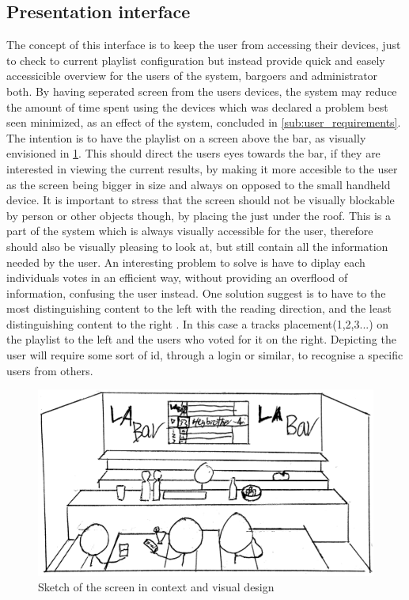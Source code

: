 \subsection{Presentation interface}

The concept of this interface is to keep the user from accessing their devices, just to check to current playlist configuration but instead provide quick and easely accessicible overview for the users of the system, bargoers and administrator both. By having seperated screen from the users devices, the system may reduce the amount of time spent using the devices which was declared a problem best seen minimized, as an effect of the system, concluded in \cref{sub:user_requirements}. The intention is to have the playlist on a screen above the bar, as visually envisioned in \cref{fig:PresentationInterface}. This should direct the users eyes towards the bar, if they are interested in viewing the current results, by making it more accesible to the user as the screen being bigger in size and always on opposed to the small handheld device\cite{DEB}. It is important to stress that the screen should not be visually blockable by person or other objects though, by placing the just under the roof. 
This is a part of the system which is always visually accessible for the user, therefore should also be visually pleasing to look at, but still contain all the information needed by the user. An interesting problem to solve is have to diplay each individuals votes in an efficient way, without providing an overflood of information, confusing the user instead. One solution suggest is to have to the most distinguishing content to the left with the reading direction, and the least distinguishing content to the right \cite{material}. In this case a tracks placement(1,2,3...) on the playlist to the left and the users who voted for it on the right. Depicting the user will require some sort of id, through a login or similar, to recognise a specific users from others.

\begin{figure}[H]
  \centering
  \includegraphics[width=1.0\linewidth]{Images/presentation.png}
  \caption{Sketch of the screen in context and visual design}\label{fig:PresentationInterface}
\end{figure}